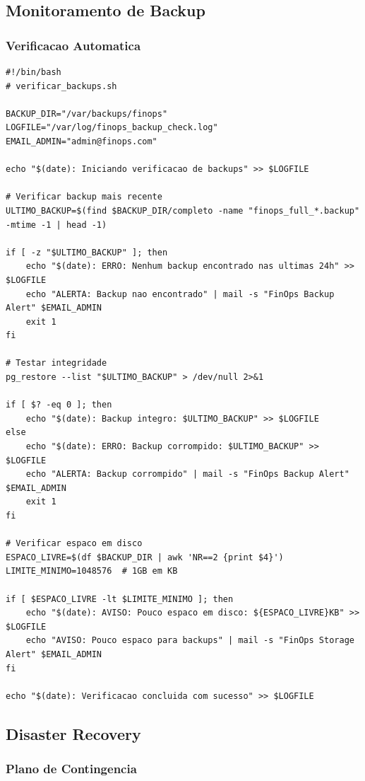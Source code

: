 \subsection{Monitoramento de Backup}

\subsubsection{Verificacao Automatica}

\begin{lstlisting}[caption=Script de verificacao de backups]
#!/bin/bash
# verificar_backups.sh

BACKUP_DIR="/var/backups/finops"
LOGFILE="/var/log/finops_backup_check.log"
EMAIL_ADMIN="admin@finops.com"

echo "$(date): Iniciando verificacao de backups" >> $LOGFILE

# Verificar backup mais recente
ULTIMO_BACKUP=$(find $BACKUP_DIR/completo -name "finops_full_*.backup" -mtime -1 | head -1)

if [ -z "$ULTIMO_BACKUP" ]; then
    echo "$(date): ERRO: Nenhum backup encontrado nas ultimas 24h" >> $LOGFILE
    echo "ALERTA: Backup nao encontrado" | mail -s "FinOps Backup Alert" $EMAIL_ADMIN
    exit 1
fi

# Testar integridade
pg_restore --list "$ULTIMO_BACKUP" > /dev/null 2>&1

if [ $? -eq 0 ]; then
    echo "$(date): Backup integro: $ULTIMO_BACKUP" >> $LOGFILE
else
    echo "$(date): ERRO: Backup corrompido: $ULTIMO_BACKUP" >> $LOGFILE
    echo "ALERTA: Backup corrompido" | mail -s "FinOps Backup Alert" $EMAIL_ADMIN
    exit 1
fi

# Verificar espaco em disco
ESPACO_LIVRE=$(df $BACKUP_DIR | awk 'NR==2 {print $4}')
LIMITE_MINIMO=1048576  # 1GB em KB

if [ $ESPACO_LIVRE -lt $LIMITE_MINIMO ]; then
    echo "$(date): AVISO: Pouco espaco em disco: ${ESPACO_LIVRE}KB" >> $LOGFILE
    echo "AVISO: Pouco espaco para backups" | mail -s "FinOps Storage Alert" $EMAIL_ADMIN
fi

echo "$(date): Verificacao concluida com sucesso" >> $LOGFILE
\end{lstlisting}

\subsection{Disaster Recovery}

\subsubsection{Plano de Contingencia}

